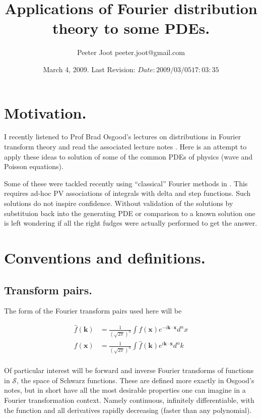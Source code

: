 \documentclass{article}
\title{ Applications of Fourier distribution theory to some PDEs. }
\author{Peeter Joot \quad peeter.joot@gmail.com }
\date{ March 4, 2009.  Last Revision: $Date: 2009/03/05 17:03:35 $ }
\newcommand{\Sw}[0]{\mathcal{S}}
\begin{document}
\maketitle{}
\tableofcontents

\section{ Motivation. }

I recently listened to Prof Brad Osgood's lectures on distributions in Fourier
transform theory and read the associated lecture notes
\cite{osgoodFourier}.  Here is an attempt to apply these ideas to solution
of some of the common PDEs of physics (wave and Poisson equations).

Some of these were tackled recently using ``classical'' Fourier methods
in \cite{PJpoisson}. 
This requires ad-hoc PV associations of integrals with delta and step
functions.  Such solutions do not inspire confidence.  Without
validation of the solutions by substituion back into the generating PDE
or comparison to a known solution one is left wondering
if all the right fudges were actually performed to get the answer.

\section{ Conventions and definitions. }

\subsection{ Transform pairs. }

The form of the Fourier transform pairs used here will be

\begin{align*}
\hat{f}(\mathbf{k}) &= \frac{1}{(\sqrt{2\pi})^n} \int f(\mathbf{x}) e^{-i \mathbf{k} \cdot \mathbf{x} } d^n x \\
{f}(\mathbf{x}) &= \frac{1}{(\sqrt{2\pi})^n} \int \hat{f}(\mathbf{k}) e^{i \mathbf{k} \cdot \mathbf{x} } d^n k \\
\end{align*}

Of particular interest will be forward and inverse Fourier transforms
of functions in $\Sw$, the space of Schwarz functions.  These are defined
more exactly in Osgood's notes, but in short have all the most desirable
properties one can imagine in a Fourier transformation context.  Namely
continuous, infinitely differentiable, with the function and all 
derivatives rapidly decreasing (faster than any polynomial).
\end{document}

